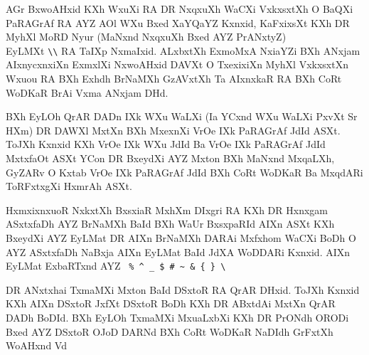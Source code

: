 AGr BxwoAHxid KXh WxuXi RA DR NxqxuXh WaCXi VxkxsxtXh O BaQXi PaRAGrAf RA AYZ AOl 
WXu Bxed XaYQaYZ Kxnxid, KaFxixsXt KXh DR MyhXl MoRD Nyur 
(MaNxnd NxqxuXh Bxed AYZ PrANxtyZ)\\ EyLMXt \verb.\\. RA TaIXp NxmaIxid.
ALxbxtXh ExmoMxA NxiaYZi BXh ANxjam AIxnycxnxiXn ExmxlXi NxwoAHxid DAVXt O TxexixiXn MyhXl VxkxsxtXn
Wxuou RA BXh Exhdh BrNaMXh \ylTXkFaRSXi{} GzAVxtXh Ta AIxnxkaR RA BXh CoRt 
WoDKaR BrAi Vxma ANxjam DHd.

 BXh EyLOh QrAR DADn IXk WXu WaLXi (Ia YCxnd WXu WaLXi PxvXt Sr HXm) 
  DR DAWXl MxtXn BXh MxexnXi VrOe IXk
  PaRAGrAf JdId ASXt.  ToJXh Kxnxid KXh VrOe IXk WXu JdId Ba VrOe IXk PaRAGrAf
  JdId MxtxfaOt ASXt YCon DR BxeydXi AYZ Mxton BXh MaNxnd MxqaLXh, GyZARv O Kxtab
 VrOe IXk PaRAGrAf JdId BXh CoRt WoDKaR Ba MxqdARi ToRFxtxgXi HxmrAh ASXt.

HxmxixnxuoR NxkxtXh BxsxiaR MxhXm DIxgri RA KXh DR Hxnxgam ASxtxfaDh AYZ BrNaMXh
\ylTXkFaRSXi{} \ylTXkFaRSXi BaId BXh WaUr BxsxpaRId AIXn ASXt KXh {\Sxiah BxeydXi AYZ EyLMat 
DR AIXn BrNaMXh DARAi Mxfxhom WaCXi BoDh O AYZ ASxtxfaDh NaBxja AIXn EyLMat 
BaId JdXA WoDDARi Kxnxid}. AIXn EyLMat ExbaRTxnd AYZ 
\verb. % ^ _ $ # ~ & { } \.


DR ANxtxhai TxmaMXi Mxton BaId DSxtoR  RA QrAR DHxid.  ToJXh Kxnxid
KXh AIXn DSxtoR JxfXt DSxtoR  BoDh KXh DR ABxtdAi MxtXn QrAR DADh
BoDId. BXh EyLOh TxmaMXi MxuaLxbXi KXh DR PrONdh ORODi Bxed AYZ DSxtoR
 OJoD DARNd BXh CoRt WoDKaR NaDIdh GrFxtXh WoAHxnd Vd



